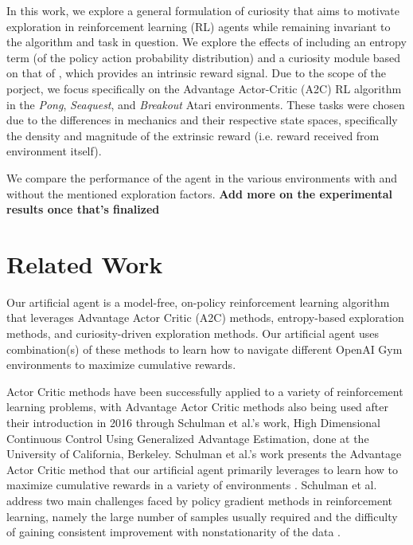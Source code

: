\documentclass{article}
\begin{document}
In this work, we explore a general formulation of curiosity that aims to motivate exploration in reinforcement learning (RL) agents while remaining invariant to the algorithm and task in question. We explore the effects of including an entropy term (of the policy action probability distribution) and a curiosity module based on that of \cite{curiosity}, which provides an intrinsic reward signal. Due to the scope of the porject, we focus specifically on the Advantage Actor-Critic (A2C) RL algorithm in the \textit{Pong}, \textit{Seaquest}, and \textit{Breakout} Atari environments. These tasks were chosen due to the differences in mechanics and their respective state spaces, specifically the density and magnitude of the extrinsic reward (i.e. reward received from environment itself).

We compare the performance of the agent in the various environments with and without the mentioned exploration factors. \textbf{Add more on the experimental results once that's finalized}

\section{Related Work}
Our artificial agent is a model-free, on-policy reinforcement learning algorithm that leverages Advantage Actor Critic (A2C) methods, entropy-based exploration methods, and curiosity-driven exploration methods. Our artificial agent uses combination(s) of these methods to learn how to navigate different OpenAI Gym \cite{gym} environments to maximize cumulative rewards.

Actor Critic methods have been successfully applied to a variety of reinforcement learning problems, with Advantage Actor Critic methods also being used after their introduction in 2016 through Schulman et al.’s work, High Dimensional Continuous Control Using Generalized Advantage Estimation, done at the University of California, Berkeley. Schulman et al.’s work presents the Advantage Actor Critic method that our artificial agent primarily leverages to learn how to maximize cumulative rewards in a variety of environments \cite{a2c}. Schulman et al. address two main challenges faced by policy gradient methods in reinforcement learning, namely the large number of samples usually required and the difficulty of gaining consistent improvement with nonstationarity of the data \cite{a2c}.
\end{document}
